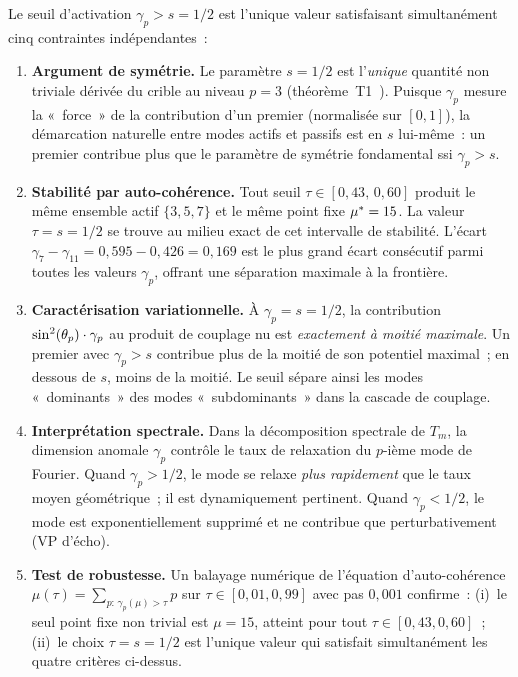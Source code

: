 \documentclass[12pt,a4paper]{article}
\begin{document}
\begin{remarque}
\label{prop:threshold_natural}
Le seuil d'activation $\gamma_p > s = 1/2$ est l'unique valeur
satisfaisant simultanément cinq contraintes indépendantes~:

\begin{enumerate}[nosep]
\item \textbf{Argument de symétrie.}
  Le paramètre $s = 1/2$ est l'\emph{unique} quantité non triviale
  dérivée du crible au niveau $p = 3$
  (théorème~T1~\cite{companion_M1}).
  Puisque $\gamma_p$ mesure la «~force~» de la contribution d'un
  premier (normalisée sur $[0,1]$), la démarcation naturelle entre
  modes actifs et passifs est en $s$ lui-même~: un premier
  contribue plus que le paramètre de symétrie fondamental ssi
  $\gamma_p > s$.

\item \textbf{Stabilité par auto-cohérence.}
  Tout seuil $\tau \in [0{,}43,\, 0{,}60]$ produit le même ensemble
  actif $\{3, 5, 7\}$ et le même point fixe ${\mu^{*}} = 15$.
  La valeur $\tau = s = 1/2$ se trouve au milieu exact de cet
  intervalle de stabilité.
  L'écart $\gamma_7 - \gamma_{11} = 0{,}595 - 0{,}426 = 0{,}169$
  est le plus grand écart consécutif parmi toutes les valeurs
  $\gamma_p$, offrant une séparation maximale à la frontière.

\item \textbf{Caractérisation variationnelle.}
  À $\gamma_p = s = 1/2$, la contribution $\sin^2(\theta_{p}) \cdot \gamma_p$
  au produit de couplage nu est \emph{exactement à moitié maximale}.
  Un premier avec $\gamma_p > s$ contribue plus de la moitié de
  son potentiel maximal~; en dessous de $s$, moins de la moitié.
  Le seuil sépare ainsi les modes «~dominants~» des modes
  «~subdominants~» dans la cascade de couplage.

\item \textbf{Interprétation spectrale.}
  Dans la décomposition spectrale de $T_m$, la dimension anomale
  $\gamma_p$ contrôle le taux de relaxation du $p$-ième mode de
  Fourier. Quand $\gamma_p > 1/2$, le mode se relaxe
  \emph{plus rapidement} que le taux moyen géométrique~; il est
  dynamiquement pertinent. Quand $\gamma_p < 1/2$, le mode est
  exponentiellement supprimé et ne contribue que perturbativement
  (VP d'écho).

\item \textbf{Test de robustesse.}
  Un balayage numérique de l'équation d'auto-cohérence
  $\mu(\tau) = \sum_{p:\,\gamma_p(\mu) > \tau} p$ sur
  $\tau \in [0{,}01, 0{,}99]$ avec pas $0{,}001$ confirme~:
  (i)~le seul point fixe non trivial est $\mu = 15$, atteint pour
  tout $\tau \in [0{,}43, 0{,}60]$~;
  (ii)~le choix $\tau = s = 1/2$ est l'unique valeur qui satisfait
  simultanément les quatre critères ci-dessus.
\end{enumerate}


\end{remarque}
\end{document}
